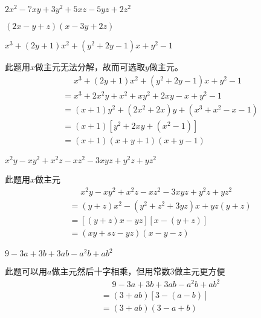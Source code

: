 \documentclass[windows,csize4]{BHCexam}
\begin{document}
\begin{groups}
    \begin{questions}[]
            \question[5] $2x^2-7xy+3y^2+5xz-5yz+2z^2$
            \begin{solution}{0.5cm}
                \methodonly $(2x-y+z)(x-3y+2z)$
            \end{solution}
            \vspace{3.5cm}

            \question[5] $x^3+(2y+1)x^2+(y^2+2y-1)x+y^2-1$
            \begin{solution}{0.5cm}
                \methodonly 此题用$x$做主元无法分解，故而可选取$y$做主元。
                \[
                    \begin{aligned}
                         & \phantom{=}x^3+(2y+1)x^2+(y^2+2y-1)x+y^2-1 \\
                         & =x^3+2x^2y+x^2+xy^2+2xy-x+y^2-1        \\
                         & =(x+1)y^2+(2x^2+2x)y+(x^3+x^2-x-1) \\
                         & =(x+1)\left[y^2+2xy+(x^2-1)\right] \\ 
                         & =(x+1)(x+y+1)(x+y-1)
                    \end{aligned}
                \]
            \end{solution}
        \vspace{3.5cm}

        \question[5] $x^2y-xy^2+x^2z-xz^2-3xyz+y^2z+yz^2$
        \begin{solution}{0.5cm}
            \methodonly 此题用$x$做主元
            \[
                \begin{aligned}
                     & \phantom{=}x^2y-xy^2+x^2z-xz^2-3xyz+y^2z+yz^2 \\
                     & =(y+z)x^2-(y^2+z^2+3yz)x+yz(y+z)  \\
                     & =\left[(y+z)x-yz\right]\left[x-(y+z)\right] \\ 
                     & = (xy+sz-yz)(x-y-z)
                \end{aligned}
            \]
        \end{solution}
        \vspace{3.5cm}

        \question[5] $9-3a+3b+3ab-a^2b+ab^2$
        \begin{solution}{0.5cm}
            \methodonly 此题可以用$a$做主元然后十字相乘，但用常数$3$做主元更方便
            \[
                \begin{aligned}
                     & \phantom{=}9-3a+3b+3ab-a^2b+ab^2 \\
                     & =(3+ab)\left[3-(a-b)\right]  \\ 
                     & =(3+ab)(3-a+b)
                \end{aligned}
            \]
        \end{solution}

    \end{questions}

\end{groups}






\label{lastpage}
\end{document}
